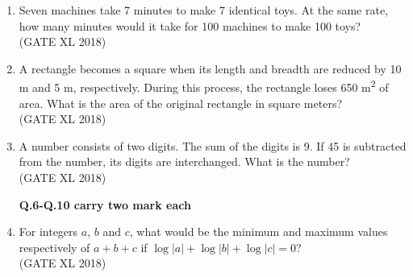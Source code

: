 \documentclass[14pt]{extarticle}
\begin{document}
\begin{flushleft}
\begin{enumerate}
\item Seven machines take 7 minutes to make 7 identical toys. At the same rate, how many minutes would it take for 100 machines to make 100 toys?\\
\hfill(GATE XL 2018)\\
\begin{enumerate}[label=(\Alph*)]
\end{enumerate}

\item A rectangle becomes a square when its length and breadth are reduced by 10 m and 5 m, respectively. During this process, the rectangle loses 650 m\textsuperscript{2} of area. What is the area of the original rectangle in square meters?\\
\hfill(GATE XL 2018)\\
\begin{enumerate}[label=(\Alph*)]
\end{enumerate}

\item A number consists of two digits. The sum of the digits is 9. If 45 is subtracted from the number, its digits are interchanged. What is the number?\\
\hfill(GATE XL 2018)\\
\begin{enumerate}[label=(\Alph*)]
\end{enumerate}
\textbf{Q.6-Q.10 carry two mark each}
  

\item For integers $a$, $b$ and $c$, what would be the minimum and maximum values respectively of $a+b+c$ if $\log |a| + \log |b| + \log |c| = 0$?\\
\hfill(GATE XL 2018)\\
\begin{enumerate}[label=(\Alph*)]
\end{enumerate}


\end{enumerate}
\end{flushleft}
\end{document}
